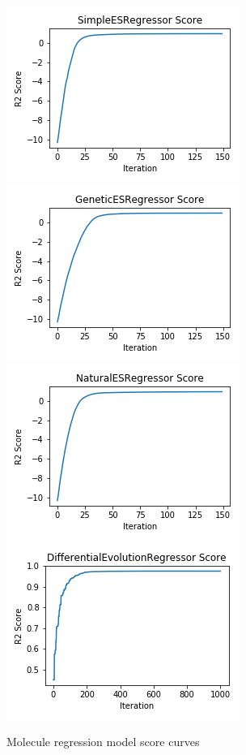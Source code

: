 \documentclass[conference]{IEEEtran}
\begin{document}
\begin{figure}[htbp]
\centering
\includegraphics[width=.4\textwidth]{Molecules-SimpleESRegressor-kPCAScoreCurve.png}
\includegraphics[width=.4\textwidth]{Molecules-GeneticESRegressor-kPCAScoreCurve.png}
\includegraphics[width=.4\textwidth]{Molecules-NaturalESRegressor-kPCAScoreCurve.png}
\includegraphics[width=.4\textwidth]{Molecules-DifferentialEvolutionRegressor-kPCAScoreCurve.png}
\caption{Molecule regression model score curves}
\label{plot:mol-score}
\end{figure}
\end{document}
